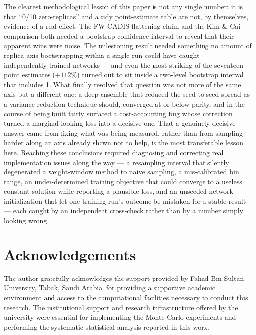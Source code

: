 \documentclass[a4paper,fleqn]{cas-sc}
\begin{document}
	The clearest methodological lesson of this paper is not any single number: it is that
	``0/10 zero-replicas'' and a tidy point-estimate table are not, by themselves, evidence of a
	real effect. The FW-CADIS flattening claim and the Kim \& Cai comparison both needed a
	bootstrap confidence interval to reveal that their apparent wins were noise. The milestoning
	result needed something no amount of replica-axis bootstrapping within a single run could
	have caught --- independently-trained networks --- and even the most striking of the
	seventeen point estimates ($+112\%$) turned out to sit inside a two-level bootstrap interval
	that includes 1. What finally resolved that question was not more of the same axis but a
	different one: a deep ensemble that reduced the seed-to-seed spread as a variance-reduction
	technique should, converged at or below parity, and in the course of being built fairly
	surfaced a cost-accounting bug whose correction turned a marginal-looking loss into a
	decisive one. That a genuinely decisive answer came from fixing what was being measured,
	rather than from sampling harder along an axis already shown not to help, is the most
	transferable lesson here. Reaching these conclusions required diagnosing and correcting real
	implementation issues along the way --- a resampling interval that silently degenerated a
	weight-window method to naive sampling, a mis-calibrated bin range, an under-determined
	training objective that could converge to a useless constant solution while reporting a
	plausible loss, and an unseeded network initialization that let one training run's outcome
	be mistaken for a stable result --- each caught by an independent cross-check rather than by
	a number simply looking wrong.
	
	\section*{Acknowledgements}
	The author gratefully acknowledges the support provided by Fahad Bin Sultan University, Tabuk, Saudi Arabia, for providing a supportive academic environment and access to the computational facilities necessary to conduct this research. The institutional support and research infrastructure offered by the university were essential for implementing the Monte Carlo experiments and performing the systematic statistical analysis reported in this work.
	
	\printcredits
	
\end{document}
